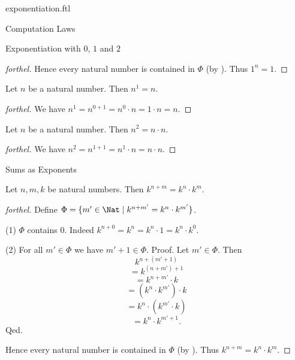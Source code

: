 \documentclass{naproche-library}
\begin{document}
\begin{smodule}[title=Exponentiation]{exponentiation.ftl}
\begin{sfragment}{Computation Laws}
\begin{sfragment}{Exponentiation with $0$, $1$ and $2$}
\begin{proof}[forthel]
      Hence every natural number is contained in $\Phi$ (by ).
      Thus $1^{n} = 1$.
    \end{proof}

    \begin{proposition}[forthel,id=ARITHMETIC_09_4975279749464064]
      Let $n$ be a natural number.
      Then $n^{1} = n$.
    \end{proposition}
    \begin{proof}[forthel]
      We have $n^{1}
        = n^{0 + 1}
        = n^{0} \cdot n
        = 1 \cdot n
        = n$.
    \end{proof}

    \begin{proposition}[forthel,id=ARITHMETIC_09_8513812055457792]
      Let $n$ be a natural number.
      Then $n^{2} = n \cdot n$.
    \end{proposition}
    \begin{proof}[forthel]
      We have $n^{2}
        = n^{1 + 1}
        = n^{1} \cdot n
        = n \cdot n$.
    \end{proof}
  \end{sfragment}

  \begin{sfragment}{Sums as Exponents}
    \begin{proposition}[forthel,id=ARITHMETIC_09_8152207530655744]
      Let $n, m, k$ be natural numbers.
      Then $k^{n + m} = k^{n} \cdot k^{m}$.
    \end{proposition}
    \begin{proof}[forthel]
      Define $\Phi = \{ m' \in \Nat \mid k^{n + m'} = k^{n} \cdot k^{m'} \}$.

      (1) $\Phi$ contains $0$. \newline
      Indeed $k^{n + 0}
        = k^{n}
        = k^{n} \cdot 1
        = k^{n} \cdot k^{0}$.

      (2) For all $m' \in \Phi$ we have $m' + 1 \in \Phi$. \newline
      Proof.
        Let $m' \in \Phi$.
        Then
        \[  k^{n + (m' + 1)}                  \]
        \[    = k^{(n + m') + 1}              \]
        \[    = k^{n + m'} \cdot k            \]
        \[    = (k^{n} \cdot k^{m'}) \cdot k  \]
        \[    = k^{n} \cdot (k^{m'} \cdot k)  \]
        \[    = k^{n} \cdot k^{m' + 1}.       \]
      Qed.

      Hence every natural number is contained in $\Phi$ (by ).
      Thus $k^{n + m} = k^{n} \cdot k^{m}$.
    \end{proof}
  \end{sfragment}


\end{sfragment}
\end{smodule}
\end{document}
